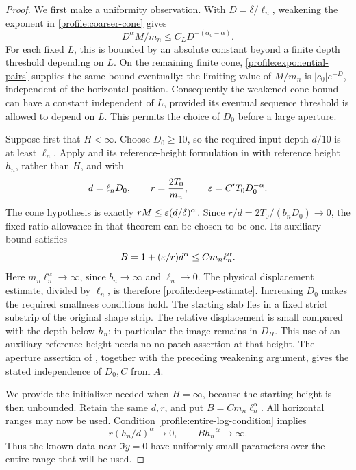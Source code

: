 \begin{proof}
We first make a uniformity observation. With \(D=\delta/\ell_n\),
weakening the exponent in \eqref{profile:coarser-cone} gives
\[
 D^\alpha M/m_n\le C_LD^{-(\alpha_0-\alpha)}.
\]
For each fixed \(L\), this is bounded by an absolute constant beyond a
finite depth threshold depending on \(L\). On the remaining finite
cone, \eqref{profile:exponential-pairs} supplies the same bound
eventually: the limiting value of \(M/m_n\) is
\(|c_0|e^{-D}\), independent of the horizontal position. Consequently
the weakened cone bound can have a constant independent of \(L\),
provided its eventual sequence threshold is allowed to depend on
\(L\). This permits the choice of \(D_0\) before a large aperture.

Suppose first that \(H<\infty\). Choose \(D_0\ge10\), so the
required input depth \(d/10\) is at least \(\ell_n\).
Apply  and its
reference-height formulation in  with reference
height \(h_n\), rather than \(H\), and with
\[
 d=\ell_nD_0,\qquad r=\frac{2T_0}{m_n},\qquad
 \varepsilon=C'T_0D_0^{-\alpha}.
\]
The cone hypothesis is exactly
\(rM\le\varepsilon(d/\delta)^\alpha\). Since
\(r/d=2T_0/(b_nD_0)\to0\), the fixed ratio allowance in that theorem
can be chosen to be one. Its auxiliary bound satisfies
\[
 B=1+(\varepsilon/r)d^\alpha\le C m_n\ell_n^\alpha.
\]
Here \(m_n\ell_n^\alpha\to\infty\), since \(b_n\to\infty\) and
\(\ell_n\to0\). The physical displacement estimate, divided by
\(\ell_n\), is therefore \eqref{profile:deep-estimate}. Increasing
\(D_0\) makes the required smallness conditions hold. The starting
slab lies in a fixed strict substrip of the original shape strip.
The relative displacement is small compared with the depth below
\(h_n\); in particular the image remains in \(D_H\). This use of an
auxiliary reference height needs no no-patch assertion at that height.
The aperture assertion of , together with the preceding
weakening argument, gives the stated independence of \(D_0,C\) from
\(A\).

We provide the initializer needed when \(H=\infty\), because the
starting height is then unbounded. Retain the same \(d,r\), and put
\(B=Cm_n\ell_n^\alpha\). All horizontal ranges may now be used.
Condition \eqref{profile:entire-log-condition} implies
\begin{equation}
 \label{profile:entire-start-smallness}
 r(h_n/d)^\alpha\longrightarrow0,
 \qquad Bh_n^{-\alpha}\longrightarrow\infty.
\end{equation}
Thus the known data near \(\Im y=0\) have uniformly small parameters
over the entire range that will be used.


\end{proof}
